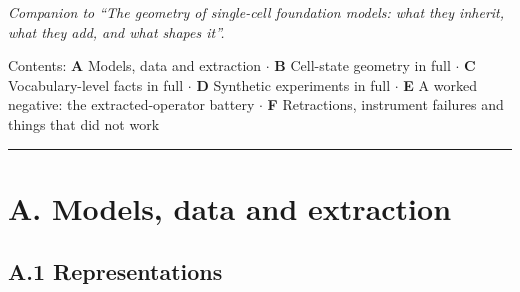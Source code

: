 \emph{Companion to ``The geometry of single-cell foundation models: what they inherit, what they add, and
what shapes it''.}

Contents:
\textbf{A} Models, data and extraction \(\cdot\)
\textbf{B} Cell-state geometry in full \(\cdot\)
\textbf{C} Vocabulary-level facts in full \(\cdot\)
\textbf{D} Synthetic experiments in full \(\cdot\)
\textbf{E} A worked negative: the extracted-operator battery \(\cdot\)
\textbf{F} Retractions, instrument failures and things that did not work

\begin{center}\rule{0.5\linewidth}{0.5pt}\end{center}

\hypertarget{a.-models-data-and-extraction}{%
\section{A. Models, data and extraction}\label{a.-models-data-and-extraction}}

\hypertarget{a.1-representations}{%
\subsection{A.1 Representations}\label{a.1-representations}}

